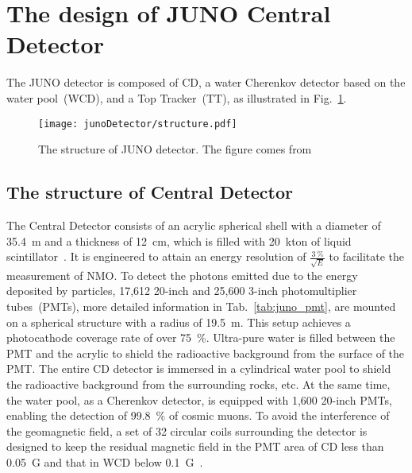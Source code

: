 
\section{The design of JUNO Central Detector}
\label{sec:juno_cd_design}
The JUNO detector is composed of CD, a water Cherenkov detector based on the water pool~(WCD), and a Top Tracker~(TT), as illustrated in Fig.~\ref{fig:juno_cd_structure}.
\begin{figure}[htbp]
	\centering
	\texttt{[image: junoDetector/structure.pdf]}
	\caption{The structure of JUNO detector. The figure comes from~\cite{muon207}}
	\label{fig:juno_cd_structure}
\end{figure}
\subsection{The structure of Central Detector}
The Central Detector consists of an acrylic spherical shell with a diameter of \SI{35.4}{m} and a thickness of \SI{12}{cm}, which is filled with \SI{20}{kton} of liquid scintillator~\cite{JUNO_CD_tech}. It is engineered to attain an energy resolution of $\frac{\SI{3}{\%}}{\sqrt{E}}$ to facilitate the measurement of NMO. To detect the photons emitted due to the energy deposited by particles, 17,612 20-inch and 25,600 3-inch photomultiplier tubes~(PMTs), more detailed information in Tab.~\ref{tab:juno_pmt}, are mounted on a spherical structure with a radius of \SI{19.5}{m}. This setup achieves a photocathode coverage rate of over \SI{75}{\%}. Ultra-pure water is filled between the PMT and the acrylic to shield the radioactive background from the surface of the PMT. The entire CD detector is immersed in a cylindrical water pool to shield the radioactive background from the surrounding rocks, etc. At the same time, the water pool, as a Cherenkov detector, is equipped with 1,600 20-inch PMTs, enabling the detection of \SI{99.8}{\%} of cosmic muons. To avoid the interference of the geomagnetic field, a set of 32 circular coils surrounding the detector is designed to keep the residual magnetic field in the PMT area of CD less than \SI{0.05}{G} and that in WCD below \SI{0.1}{G}~\cite{muon207}.

